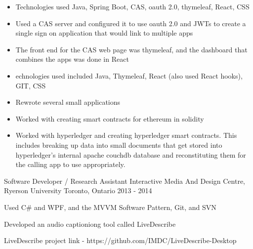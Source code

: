 \begin{cventries}
{\begin{cvitems}
{\begin{itemize}
                    \item {Technologies used Java, Spring Boot, CAS, oauth 2.0, thymeleaf, React, CSS}
                    \item {Used a CAS server and configured it to use oauth 2.0 and JWTs to create a single sign on application that would link to multiple apps}
                    \item {The front end for the CAS web page was thymeleaf, and the dashboard that combines the apps was done in React}
                \end{itemize}
            }
            \item[] {
                \begin{itemize}
                    \item {echnologies used included Java, Thymeleaf, React (also used React hooks), GIT, CSS}
                    \item {Rewrote several small applications}
                \end{itemize}
            }
            \item[] {
                \begin{itemize}
                    \item {Worked with creating smart contracts for ethereum in solidity}
                    \item {Worked with hyperledger and creating hyperledger smart contracts.
                            This includes breaking up data into small documents that get stored into hyperledger’s internal apache couchdb database and reconstituting
                            them for the calling app to use appropriately.}
                \end{itemize}
            }
        \end{cvitems}
    }

    \cventry
    {Software Developer / Research Assistant}
    {Interactive Media And Design Centre, Ryerson University}
    {Toronto, Ontario}
    {2013 - 2014}
    {
        \begin{cvitems}
            \item {Used C\# and WPF, and the MVVM Software Pattern, Git, and SVN}
            \item {Developed an audio captioniong tool called LiveDescribe}
            \item {LiveDescribe project link - https://github.com/IMDC/LiveDescribe-Desktop}
        \end{cvitems}
    }
\end{cventries}